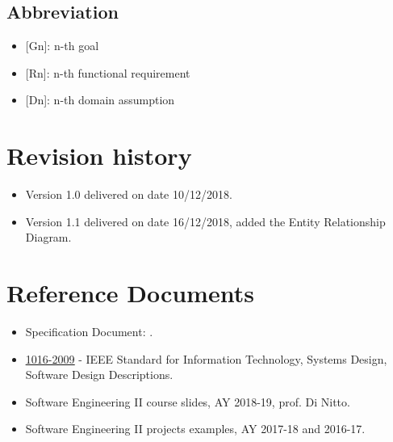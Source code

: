 \subsection{Abbreviation}
\begin{itemize}
    \item {[Gn]}: n-th goal
    \item {[Rn]}: n-th functional requirement
    \item {[Dn]}: n-th domain assumption
\end{itemize}

\section{Revision history}
\begin{itemize}
    \item Version 1.0 delivered on date 10/12/2018.
    \item Version 1.1 delivered on date 16/12/2018, added the Entity Relationship Diagram.
\end{itemize}

\section{Reference Documents}
\begin{itemize}
    \item Specification Document: . 
    \item \href{https://ieeexplore.ieee.org/document/5167255} {\underline{1016-2009}} - IEEE Standard for Information Technology, Systems Design, Software Design Descriptions.
    \item Software Engineering II course slides, AY 2018-19, prof. Di Nitto.
    \item Software Engineering II projects examples, AY 2017-18 and 2016-17.
\end{itemize}

